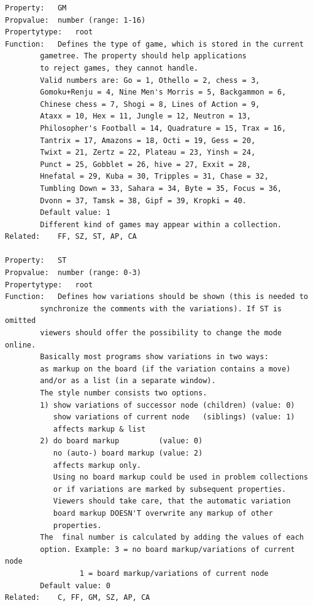 \begin{verbatim}
Property:   GM
Propvalue:  number (range: 1-16)
Propertytype:   root
Function:   Defines the type of game, which is stored in the current
        gametree. The property should help applications
        to reject games, they cannot handle.
        Valid numbers are: Go = 1, Othello = 2, chess = 3,
        Gomoku+Renju = 4, Nine Men's Morris = 5, Backgammon = 6,
        Chinese chess = 7, Shogi = 8, Lines of Action = 9,
        Ataxx = 10, Hex = 11, Jungle = 12, Neutron = 13,
        Philosopher's Football = 14, Quadrature = 15, Trax = 16,
        Tantrix = 17, Amazons = 18, Octi = 19, Gess = 20,
        Twixt = 21, Zertz = 22, Plateau = 23, Yinsh = 24,
        Punct = 25, Gobblet = 26, hive = 27, Exxit = 28,
        Hnefatal = 29, Kuba = 30, Tripples = 31, Chase = 32,
        Tumbling Down = 33, Sahara = 34, Byte = 35, Focus = 36,
        Dvonn = 37, Tamsk = 38, Gipf = 39, Kropki = 40.
        Default value: 1
        Different kind of games may appear within a collection.
Related:    FF, SZ, ST, AP, CA

Property:   ST
Propvalue:  number (range: 0-3)
Propertytype:   root
Function:   Defines how variations should be shown (this is needed to
        synchronize the comments with the variations). If ST is omitted
        viewers should offer the possibility to change the mode online.
        Basically most programs show variations in two ways:
        as markup on the board (if the variation contains a move)
        and/or as a list (in a separate window).
        The style number consists two options.
        1) show variations of successor node (children) (value: 0)
           show variations of current node   (siblings) (value: 1)
           affects markup & list
        2) do board markup         (value: 0)
           no (auto-) board markup (value: 2)
           affects markup only.
           Using no board markup could be used in problem collections
           or if variations are marked by subsequent properties.
           Viewers should take care, that the automatic variation
           board markup DOESN'T overwrite any markup of other
           properties.
        The  final number is calculated by adding the values of each
        option. Example: 3 = no board markup/variations of current node
                 1 = board markup/variations of current node
        Default value: 0
Related:    C, FF, GM, SZ, AP, CA


\end{verbatim}

